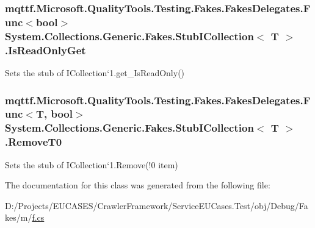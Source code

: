 \hypertarget{class_system_1_1_collections_1_1_generic_1_1_fakes_1_1_stub_i_collection_3_01_t_01_4_a6bd2a769fef62b268e7c73f216c8f246}{
\subsubsection[{Is\-Read\-Only\-Get}]{\setlength{\rightskip}{0pt plus 5cm}mqttf.\-Microsoft.\-Quality\-Tools.\-Testing.\-Fakes.\-Fakes\-Delegates.\-Func$<$bool$>$ System.\-Collections.\-Generic.\-Fakes.\-Stub\-I\-Collection$<$ T $>$.Is\-Read\-Only\-Get}}\label{class_system_1_1_collections_1_1_generic_1_1_fakes_1_1_stub_i_collection_3_01_t_01_4_a6bd2a769fef62b268e7c73f216c8f246}


Sets the stub of I\-Collection`1.get\-\_\-\-Is\-Read\-Only()

\hypertarget{class_system_1_1_collections_1_1_generic_1_1_fakes_1_1_stub_i_collection_3_01_t_01_4_a8ce0ead9b83e04876509bb7cb1cbd265}{
\subsubsection[{Remove\-T0}]{\setlength{\rightskip}{0pt plus 5cm}mqttf.\-Microsoft.\-Quality\-Tools.\-Testing.\-Fakes.\-Fakes\-Delegates.\-Func$<$T, bool$>$ System.\-Collections.\-Generic.\-Fakes.\-Stub\-I\-Collection$<$ T $>$.Remove\-T0}}\label{class_system_1_1_collections_1_1_generic_1_1_fakes_1_1_stub_i_collection_3_01_t_01_4_a8ce0ead9b83e04876509bb7cb1cbd265}


Sets the stub of I\-Collection`1.Remove(!0 item)



The documentation for this class was generated from the following file\-:\begin{DoxyCompactItemize}
\item 
D\-:/\-Projects/\-E\-U\-C\-A\-S\-E\-S/\-Crawler\-Framework/\-Service\-E\-U\-Cases.\-Test/obj/\-Debug/\-Fakes/m/\hyperlink{m_2f_8cs}{f.\-cs}\end{DoxyCompactItemize}
